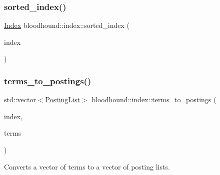 \subsubsection{\texorpdfstring{sorted\+\_\+index()}{sorted\_index()}}
{\footnotesize\ttfamily \hyperlink{classbloodhound_1_1index_1_1Index}{Index} bloodhound\+::index\+::sorted\+\_\+index (\begin{DoxyParamCaption}\item[{const \hyperlink{classbloodhound_1_1index_1_1Index}{Index} \&}]{index }\end{DoxyParamCaption})}

\mbox{\label{namespacebloodhound_1_1index_ae2ed61317e7a37db7d9f19d2b65e2a11}} 
\subsubsection{\texorpdfstring{terms\+\_\+to\+\_\+postings()}{terms\_to\_postings()}}
{\footnotesize\ttfamily std\+::vector$<$\hyperlink{classbloodhound_1_1PostingList}{Posting\+List}$>$ bloodhound\+::index\+::terms\+\_\+to\+\_\+postings (\begin{DoxyParamCaption}\item[{\hyperlink{classbloodhound_1_1index_1_1Index}{Index} \&}]{index,  }\item[{const std\+::vector$<$ \hyperlink{structbloodhound_1_1TermId}{Term\+Id} $>$}]{terms }\end{DoxyParamCaption})}



Converts a vector of terms to a vector of posting lists. 

